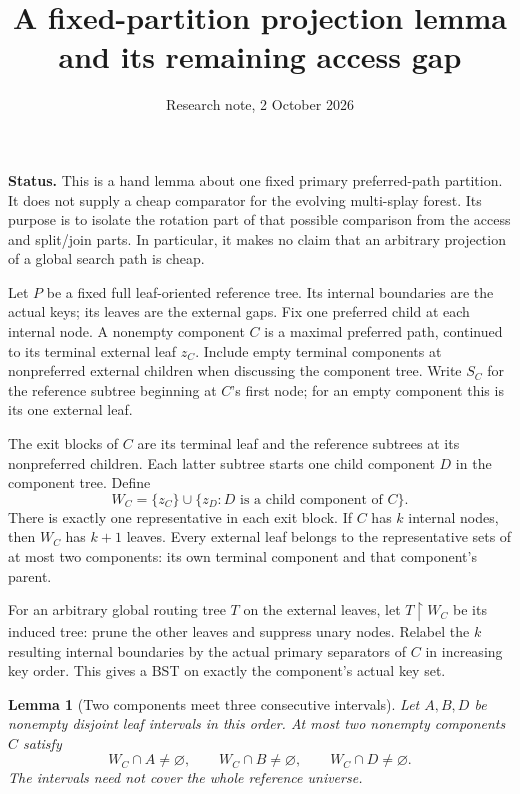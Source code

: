 \documentclass[11pt]{article}
\title{A fixed-partition projection lemma and its remaining access gap}
\author{Research note, 2 October 2026}
\date{}
\newtheorem{lemma}{Lemma}
\begin{document}
\maketitle

\noindent\textbf{Status.}
This is a hand lemma about one fixed primary preferred-path partition.
It does not supply a cheap comparator for the evolving multi-splay forest.
Its purpose is to isolate the rotation part of that possible comparison
from the access and split/join parts. In particular, it makes no claim
that an arbitrary projection of a global search path is cheap.

Let $P$ be a fixed full leaf-oriented reference tree. Its internal
boundaries are the actual keys; its leaves are the external gaps.
Fix one preferred child at each internal node. A nonempty component
$C$ is a maximal preferred path, continued to its terminal external
leaf $z_C$. Include empty terminal components at nonpreferred external
children when discussing the component tree. Write $S_C$ for the
reference subtree beginning at $C$'s first node; for an empty component
this is its one external leaf.

The exit blocks of $C$ are its terminal leaf and the reference subtrees
at its nonpreferred children. Each latter subtree starts one child
component $D$ in the component tree. Define
\[
 W_C=\{z_C\}\cup\{z_D:D\text{ is a child component of }C\}.
\]
There is exactly one representative in each exit block. If $C$ has
$k$ internal nodes, then $W_C$ has $k+1$ leaves. Every external leaf
belongs to the representative sets of at most two components: its own
terminal component and that component's parent.

For an arbitrary global routing tree $T$ on the external leaves, let
$T\upharpoonright W_C$ be its induced tree: prune the other leaves and
suppress unary nodes. Relabel the $k$ resulting internal boundaries
by the actual primary separators of $C$ in increasing key order.
This gives a BST on exactly the component's actual key set.

\begin{lemma}[Two components meet three consecutive intervals]
Let $A,B,D$ be nonempty disjoint leaf intervals in this order. At most
two nonempty components $C$ satisfy
\[
 W_C\cap A\ne\varnothing,\qquad
 W_C\cap B\ne\varnothing,\qquad
 W_C\cap D\ne\varnothing.
\]
The intervals need not cover the whole reference universe.
\end{lemma}
\end{document}
